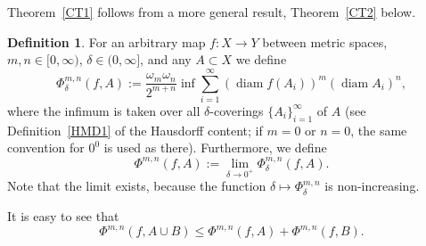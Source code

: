 \documentclass[12pt,leqno]{amsart}
\theoremstyle{definition}
\newtheorem{definition}[theorem]{Definition}
\def\diam{\operatorname{diam}}
\numberwithin{theorem}{section} \numberwithin{equation}{section}
\begin{document}
Theorem~\ref{CT1} follows from a more general result, Theorem~\ref{CT2} below.
\begin{definition}
\label{CD1}
For an arbitrary map $f:X\to Y$ between metric spaces, $m,n\in [0,\infty)$, $\delta\in (0,\infty]$, and any $A\subset X$ we define
$$
\Phi^{m,n}_\delta(f,A):=\frac{\omega_m\omega_n}{2^{m+n}}\inf\sum_{i=1}^\infty (\diam f(A_i))^m(\diam A_i)^n,
$$
where the infimum is taken over all $\delta$-coverings  $\{A_i\}_{i=1}^\infty$ of $A$ (see Definition~\ref{HMD1} of the Hausdorff content; if $m=0$ or $n=0$, the same convention for $0^0$ is used as there). Furthermore, we define
$$
\Phi^{m,n}(f,A):=\lim_{\delta\to 0^+}\Phi^{m,n}_\delta(f,A).
$$
Note that the limit exists, because the function $\delta\mapsto\Phi_\delta^{m,n}$ is non-increasing.
\end{definition}
It is easy to see that
\begin{equation}
\label{Ceq1}
\Phi^{m,n}(f,A\cup B)\leq \Phi^{m,n}(f,A)+\Phi^{m,n}(f,B).
\end{equation}
\end{document}
